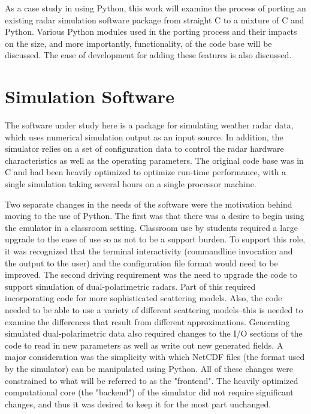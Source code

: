 \documentclass[twocolumn]{article}
\begin{document}
As a case study in using Python, this work will examine the process of porting
an existing radar simulation software package from straight C to a mixture of C
and Python. Various Python modules used in the porting process and their impacts
on the size, and more importantly, functionality, of the code base will be
discussed. The ease of development for adding these features is also discussed.

\section{Simulation Software}
The software under study here is a package for simulating weather radar data,
which uses numerical simulation output as an input source. In addition, the
simulator relies on a set of configuration data to control the radar hardware
characteristics as well as the operating parameters. The original code base was
in C and had been heavily optimized to optimize run-time performance, with a
single simulation taking several hours on a single processor machine.

Two separate changes in the needs of the software were the motivation behind
moving to the use of Python. The first was that there was a desire to
begin using the emulator in a classroom setting. Classroom use by students
required a large upgrade to the ease of use so as not to be a support burden. To
support this role, it was recognized that the terminal interactivity
(commandline invocation and the output to the user) and the configuration file
format would need to be improved. The second driving requirement was the need to
upgrade the code to support simulation of dual-polarimetric radars. Part of this
required incorporating code for more sophisticated scattering models. Also, the
code needed to be able to use a variety of different scattering models--this is
needed to examine the differences that result from different approximations.
Generating simulated dual-polarimetric data also required changes to the I/O
sections of the code to read in new parameters as well as write out new
generated fields. A major consideration was the simplicity with which NetCDF
files (the format used by the simulator) can be manipulated using Python. All of
these changes were constrained to what will be referred to as the "frontend".
The heavily optimized computational core (the "backend") of the simulator did
not require significant changes, and thus it was desired to keep it for the most
part unchanged.
\end{document}
